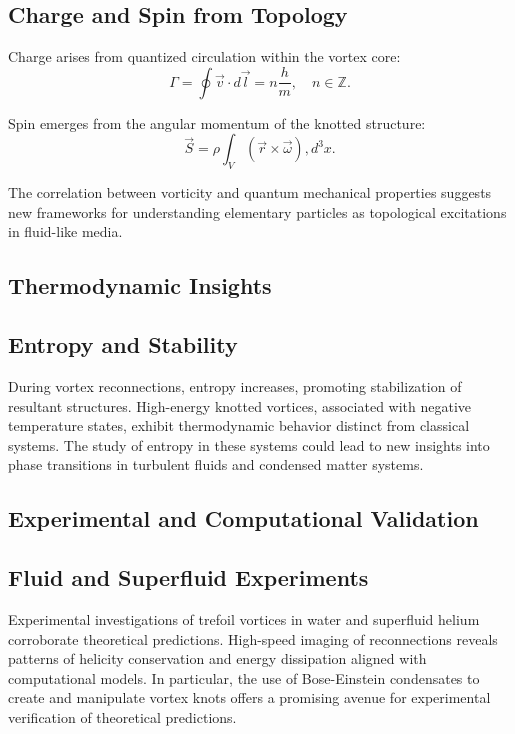 \documentclass[a4paper,10pt]{article}
\begin{document}
\subsection*{Charge and Spin from Topology}


Charge arises from quantized circulation within the vortex core:
\begin{equation*}
\Gamma = \oint \vec{v} \cdot d\vec{l} = n \frac{h}{m}, \quad n \in \mathbb{Z}.
\end{equation*}


Spin emerges from the angular momentum of the knotted structure:
\begin{equation*}
\vec{S} = \rho \int_V (\vec{r} \times \vec{\omega}) , d^3x.
\end{equation*}


The correlation between vorticity and quantum mechanical properties suggests new frameworks for understanding elementary particles as topological excitations in fluid-like media.


\subsection*{Thermodynamic Insights}


\subsection*{Entropy and Stability}


During vortex reconnections, entropy increases, promoting stabilization of resultant structures. High-energy knotted vortices, associated with negative temperature states, exhibit thermodynamic behavior distinct from classical systems. The study of entropy in these systems could lead to new insights into phase transitions in turbulent fluids and condensed matter systems.


\subsection*{Experimental and Computational Validation}


\subsection*{Fluid and Superfluid Experiments}


Experimental investigations of trefoil vortices in water and superfluid helium corroborate theoretical predictions. High-speed imaging of reconnections reveals patterns of helicity conservation and energy dissipation aligned with computational models. In particular, the use of Bose-Einstein condensates to create and manipulate vortex knots offers a promising avenue for experimental verification of theoretical predictions.
\end{document}
